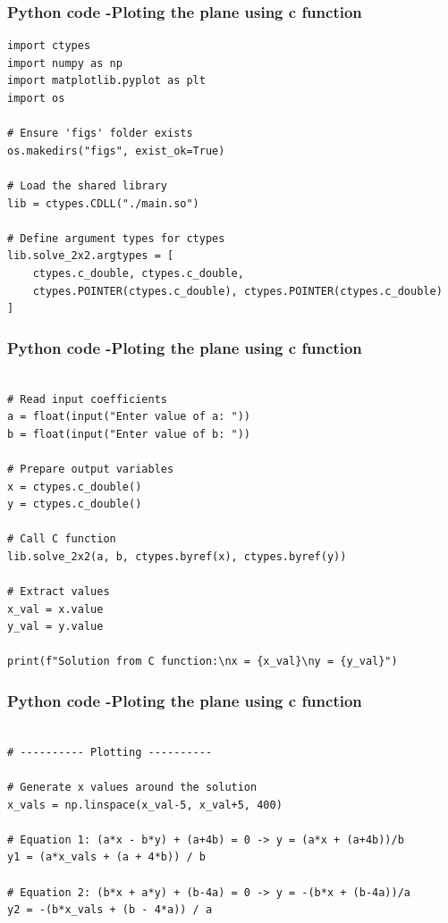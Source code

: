 \documentclass{beamer}
\begin{document}
	
\begin{frame}[fragile]                              
	\frametitle{Python code -Ploting the plane using c function} 
	\begin{lstlisting}
import ctypes
import numpy as np
import matplotlib.pyplot as plt
import os

# Ensure 'figs' folder exists
os.makedirs("figs", exist_ok=True)

# Load the shared library
lib = ctypes.CDLL("./main.so")

# Define argument types for ctypes
lib.solve_2x2.argtypes = [
    ctypes.c_double, ctypes.c_double,
    ctypes.POINTER(ctypes.c_double), ctypes.POINTER(ctypes.c_double)
]
\end{lstlisting}
\end{frame}

	
\begin{frame}[fragile]                              
	\frametitle{Python code -Ploting the plane using c function} 
	\begin{lstlisting}

# Read input coefficients
a = float(input("Enter value of a: "))
b = float(input("Enter value of b: "))

# Prepare output variables
x = ctypes.c_double()
y = ctypes.c_double()

# Call C function
lib.solve_2x2(a, b, ctypes.byref(x), ctypes.byref(y))

# Extract values
x_val = x.value
y_val = y.value

print(f"Solution from C function:\nx = {x_val}\ny = {y_val}")
\end{lstlisting}
\end{frame}

	
\begin{frame}[fragile]                              
	\frametitle{Python code -Ploting the plane using c function} 
	\begin{lstlisting}

# ---------- Plotting ----------

# Generate x values around the solution
x_vals = np.linspace(x_val-5, x_val+5, 400)

# Equation 1: (a*x - b*y) + (a+4b) = 0 -> y = (a*x + (a+4b))/b
y1 = (a*x_vals + (a + 4*b)) / b

# Equation 2: (b*x + a*y) + (b-4a) = 0 -> y = -(b*x + (b-4a))/a
y2 = -(b*x_vals + (b - 4*a)) / a
\end{lstlisting}
\end{frame}
\end{document}
